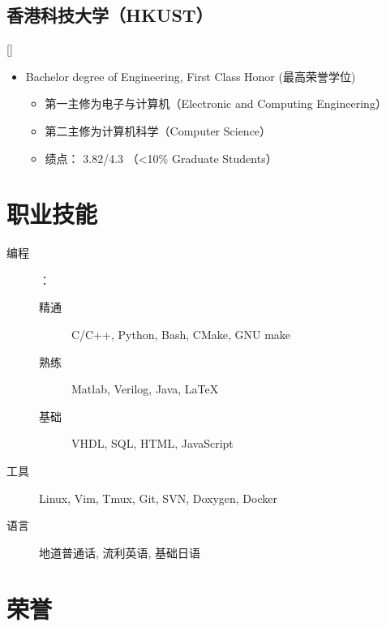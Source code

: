 \documentclass{mycv}
\begin{document}
\subsection{香港科技大学（HKUST）}[]
\vspace{-\parskip}%
\begin{itemize}[label={}]
	\item Bachelor degree of Engineering, First Class Honor (最高荣誉学位)
	\begin{itemize}[label=\textbullet]
      \item 第一主修为电子与计算机（Electronic and Computing Engineering）
      \item 第二主修为计算机科学（Computer Science）
      \item 绩点： 3.82/4.3 （<10\% Graduate Students）
	\end{itemize}
\end{itemize}

\section{职业技能}

\begin{description}
	
  \item[编程]：
  \begin{description}
  	\item[精通] C/C++, Python, Bash, CMake, GNU make
    \item[熟练] Matlab, Verilog, Java, \LaTeX
    \item[基础] VHDL, SQL, HTML, JavaScript
  \end{description}
  \item[工具] Linux, Vim, Tmux, Git, SVN, Doxygen, Docker %
  \item[语言] 地道普通话, 流利英语, 基础日语
\end{description}

\section{荣誉}

\end{document}
